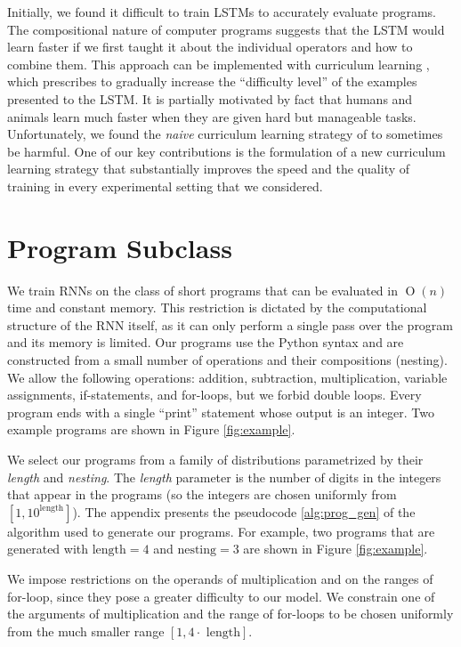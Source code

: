 Initially, we found it difficult to train LSTMs to accurately evaluate programs. The compositional nature of computer programs suggests that the LSTM would learn faster if we first taught it about the individual operators and how to combine them.  This approach can be implemented with curriculum learning
 \citep{bengio2009curriculum, kumar2010self, lee2011learning}, which prescribes to gradually increase the ``difficulty level'' of the examples presented to the LSTM. It is partially motivated by fact that humans and animals learn much faster when they are given hard but manageable tasks. Unfortunately, we found the \textit{naive}
curriculum learning strategy of \citet{bengio2009curriculum} to sometimes be harmful. One of our key contributions is the formulation of a new curriculum learning strategy that substantially improves the speed and the quality of training in every experimental setting that we considered.

\section{Program Subclass}

\label{sec:ffcm}

We train RNNs on the class of short programs that can be evaluated in $\ensuremath{\operatorname{O}\left(n\right)}$ time and constant memory. This restriction is dictated by the computational structure of the RNN itself, as it can only perform a single pass over the program and its memory is limited. Our programs use the Python syntax and are constructed from a small number of operations and their compositions (nesting). We allow the following operations: addition, subtraction, multiplication, variable assignments, if-statements, and for-loops, but we forbid double loops. Every program ends with a single ``print'' statement whose output is an integer. Two example programs are shown in Figure \ref{fig:example}.

We select our programs from a family of distributions parametrized by their \textit{length} and \textit{nesting}. 
The \textit{length} parameter is the number of digits in the integers that appear in the programs (so the integers are chosen uniformly from $[1, 10^{\mathrm{length}}]$).    
The appendix presents the pseudocode \ref{alg:prog_gen} of the algorithm used to generate our programs. For example, two programs that are generated with $\text{length}=4$ and $\text{nesting}=3$ are shown in Figure \ref{fig:example}.

We impose restrictions on the operands of multiplication and on the ranges of for-loop, since they pose a greater difficulty to our model. We constrain one of the arguments of multiplication and the range of for-loops to be chosen uniformly from the much smaller range $[1, 4\cdot\text{ length}]$. 

